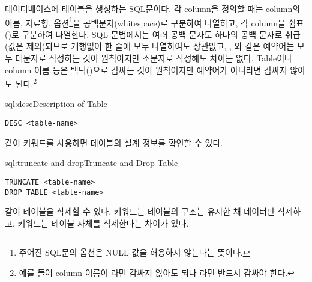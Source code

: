\는 데이터베이스에  테이블을 생성하는 SQL문이다. 각 column을 정의할 때는 column의 이름, 자료형, 옵션\footnote{주어진 SQL문의  옵션은 NULL 값을 허용하지 않는다는 뜻이다.}을 공백문자(whitespace)로 구분하여 나열하고, 각 column을 쉼표(\cd{,})로 구분하여 나열한다. SQL 문법에서는 여러 공백 문자도 하나의 공백 문자로 취급(값은 제외)되므로 개행없이 한 줄에 모두 나열하여도 상관없고, , 와 같은 예약어는 모두 대문자로 작성하는 것이 원칙이지만 소문자로 작성해도 차이는 없다. Table이나 column 이름 등은 백틱()으로 감싸는 것이 원칙이지만 예약어가 아니라면 감싸지 않아도 된다.\footnote{예를 들어 column 이름이 라면 감싸지 않아도 되나 라면 반드시 감싸야 한다.}

\begin{sqlenv}{sql:desc}{Description of Table}\begin{verbatim}
DESC <table-name>
\end{verbatim}
\end{sqlenv}

\과 같이  키워드를 사용하면 테이블의 설계 정보를 확인할 수 있다.

\begin{sqlenv}{sql:truncate-and-drop}{Truncate and Drop Table}\begin{verbatim}
TRUNCATE <table-name>
DROP TABLE <table-name>
\end{verbatim}
\end{sqlenv}

\과 같이 테이블을 삭제할 수 있다.  키워드는 테이블의 구조는 유지한 채 데이터만 삭제하고,  키워드는 테이블 자체를 삭제한다는 차이가 있다.
